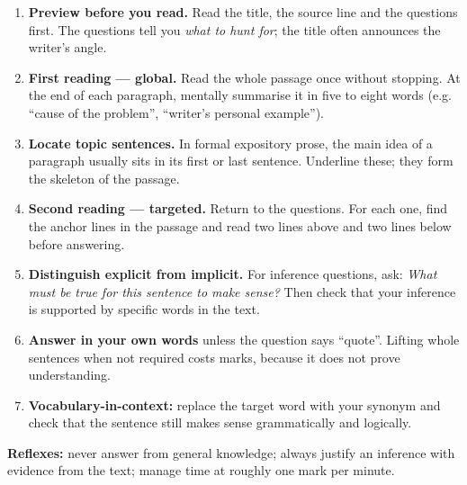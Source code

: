 \documentclass[11pt]{article}
\newcommand{\cle}[1]{{\popxbold\color{popdark}#1}}
\begin{document}
\begin{methode}
\begin{enumerate}
\item \textbf{Preview before you read.} Read the title, the source line and the questions first. The questions tell you \emph{what to hunt for}; the title often announces the writer's angle.
\item \textbf{First reading — global.} Read the whole passage once without stopping. At the end of each paragraph, mentally summarise it in five to eight words (e.g. ``cause of the problem'', ``writer's personal example'').
\item \textbf{Locate topic sentences.} In formal expository prose, the main idea of a paragraph usually sits in its first or last sentence. Underline these; they form the skeleton of the passage.
\item \textbf{Second reading — targeted.} Return to the questions. For each one, find the \cle{anchor lines} in the passage and read two lines above and two lines below before answering.
\item \textbf{Distinguish explicit from implicit.} For inference questions, ask: \emph{What must be true for this sentence to make sense?} Then check that your inference is supported by specific words in the text.
\item \textbf{Answer in your own words} unless the question says ``quote''. Lifting whole sentences when not required costs marks, because it does not prove understanding.
\item \textbf{Vocabulary-in-context:} replace the target word with your synonym and check that the sentence still makes sense grammatically and logically.
\end{enumerate}
\textbf{Reflexes:} never answer from general knowledge; always justify an inference with evidence from the text; manage time at roughly one mark per minute.
\end{methode}
\end{document}

